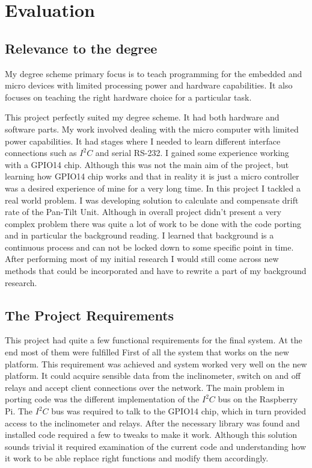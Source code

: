 \chapter{Evaluation}
\section*{Relevance to the degree}
My degree scheme primary focus is to teach programming for the embedded and micro devices with limited processing power and hardware capabilities. It also focuses on teaching the right hardware choice for a particular task.

This project perfectly suited my degree scheme. It had both hardware and software parts. My work involved dealing with the micro computer with limited power capabilities. It had stages where I needed to learn different interface connections such as $I^2C$ and serial RS-232. I gained some experience working with a GPIO14 chip. Although this was not the main aim of the project, but learning how GPIO14 chip works and that in reality it is just a micro controller was a desired experience of mine for a very long time.  In this project I tackled a real world problem. I was developing solution to calculate and compensate drift rate of the Pan-Tilt Unit. Although in overall project didn't present a very complex problem there was quite a lot of work to be done with the code porting and in particular the background reading. I learned that background is a continuous process and can not be locked down to some specific point in time. After performing most of my initial research I would still come across new methods that could be incorporated and have to rewrite a part of my background research. 

\section*{The Project Requirements}
This project had quite a few functional requirements for the final system. At the end most of them were fulfilled  First of all the system that works on the new platform. This requirement was achieved and system worked very well on the new platform. It could acquire sensible data from the inclinometer, switch on and off relays and accept client connections over the network. The main problem in porting code was the different implementation of the $I^2C$ bus on the Raspberry Pi. The $I^2C$ bus was required to talk to the GPIO14 chip, which in turn provided access to the inclinometer and relays. After the necessary library was found and installed code required a few to tweaks to make it work. Although this solution sounds trivial it required examination of the current code and understanding how it work to be able replace right functions and modify them accordingly.  

